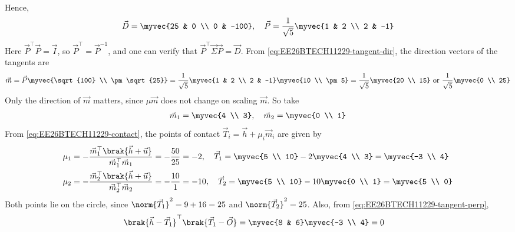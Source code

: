 \begin{enumerate}[label=\thesubsection.\arabic*, ref=\thesubsection.\theenumi]
\begin{align}
\end{align}
Hence,
\begin{align}
	\vec{D} = \myvec{25 & 0 \\ 0 & -100}, \quad \vec{P} = \frac{1}{\sqrt{5}}\myvec{1 & 2 \\ 2 & -1}
\end{align}
Here $\vec{P}^{\top}\vec{P} = \vec{I}$, so $\vec{P}^{\top} = \vec{P}^{-1}$, and one can verify that $\vec{P}^{\top}\vec{\Sigma}\vec{P} = \vec{D}$. From \eqref{eq:EE26BTECH11229-tangent-dir}, the direction vectors of the tangents are
\begin{align}
	\vec{m} = \vec{P}\myvec{\sqrt{100} \\ \pm\sqrt{25}} = \frac{1}{\sqrt{5}}\myvec{1 & 2 \\ 2 & -1}\myvec{10 \\ \pm 5}
	= \frac{1}{\sqrt{5}}\myvec{20 \\ 15} \text{ or } \frac{1}{\sqrt{5}}\myvec{0 \\ 25}
\end{align}
Only the direction of $\vec{m}$ matters, since $\mu\vec{m}$ does not change on scaling $\vec{m}$. So take
\begin{align}
	\vec{m}_1 = \myvec{4 \\ 3}, \quad \vec{m}_2 = \myvec{0 \\ 1}
\end{align}
From \eqref{eq:EE26BTECH11229-contact}, the points of contact $\vec{T}_i = \vec{h} + \mu_i\vec{m}_i$ are given by
\begin{align}
	\mu_1 &= -\frac{\vec{m}_1^{\top}\brak{\vec{h}+\vec{u}}}{\vec{m}_1^{\top}\vec{m}_1} = -\frac{50}{25} = -2, \quad
	\vec{T}_1 = \myvec{5 \\ 10} - 2\myvec{4 \\ 3} = \myvec{-3 \\ 4}
	\\
	\mu_2 &= -\frac{\vec{m}_2^{\top}\brak{\vec{h}+\vec{u}}}{\vec{m}_2^{\top}\vec{m}_2} = -\frac{10}{1} = -10, \quad
	\vec{T}_2 = \myvec{5 \\ 10} - 10\myvec{0 \\ 1} = \myvec{5 \\ 0}
\end{align}
Both points lie on the circle, since $\norm{\vec{T}_1}^2 = 9 + 16 = 25$ and $\norm{\vec{T}_2}^2 = 25$. Also, from \eqref{eq:EE26BTECH11229-tangent-perp},
\begin{align}
	\brak{\vec{h}-\vec{T}_1}^{\top}\brak{\vec{T}_1-\vec{O}} &= \myvec{8 & 6}\myvec{-3 \\ 4} = 0

\end{align}
\end{enumerate}
